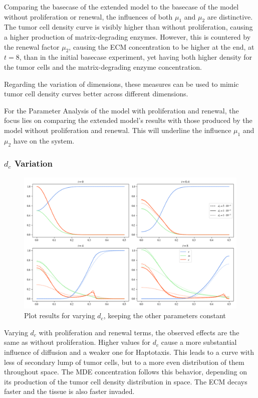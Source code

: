 Comparing the basecase of the extended model to the basecase of the model without proliferation or renewal, the influences of both $\mu_1$ and $\mu_2$ are distinctive. The tumor cell density curve is visibly higher than without proliferation, causing a higher production of matrix-degrading enzymes. However, this is countered by the renewal factor $\mu_2$, causing the ECM concentration to be higher at the end, at $t=8$, than in the initial basecase experiment, yet having both higher density for the tumor cells and the matrix-degrading enzyme concentration.

Regarding the variation of dimensions, these measures can be used to mimic tumor cell density curves better across different dimensions.

For the Parameter Analysis of the model with proliferation and renewal, the focus lies on comparing the extended model's results with those produced by the model without proliferation and renewal. This will underline the influence $\mu_1$ and $\mu_2$ have on the system.

\subsubsection*{$d_c$ Variation}
\begin{figure}[h!]
    \centering
    \includegraphics[width=\textwidth]{resources/images/prolif_dc_variation.png}
    \caption{Plot results for varying $d_c$, keeping the other parameters constant}
    \label{fig:prolif_dc_comparison}
\end{figure}

Varying $d_c$ with proliferation and renewal terms, the observed effects are the same as without proliferation. Higher values for $d_c$ cause a more substantial influence of diffusion and a weaker one for Haptotaxis. This leads to a curve with less of secondary lump of tumor cells, but to a more even distribution of them throughout space. The MDE concentration follows this behavior, depending on its production of the tumor cell density distribution in space. The ECM decays faster and the tissue is also faster invaded. 

